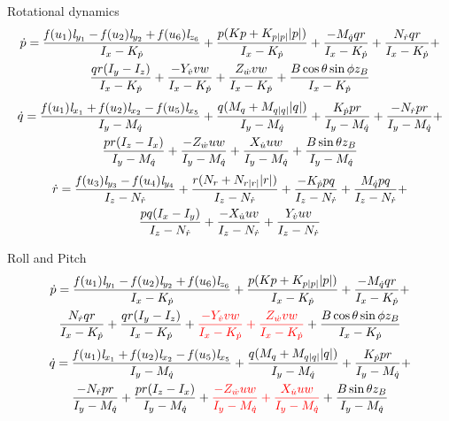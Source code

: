 \documentclass[11pt]{beamer}
\begin{document}
\begin{frame}[shrink]{Rotational dynamics}
\begin{multline} \label{eq:p_dot}
\dot{p} = \frac{\mathit{f}(u_{1}) \mathit{l}_{y_{1}} - \mathit{f}(u_{2}) \mathit{l}_{y_{2}} + \mathit{f}(u_{6}) \mathit{l}_{z_{6}}}{I_{x} - K_{\dot{p}}} + \frac{p (Kp + K_{p|p|} |p|)}{I_{x} - K_{\dot{p}}} + \frac{-M_{\dot{q}} q r}{I_{x} - K_{\dot{p}}} + \frac{N_{\dot{r}} q r}{I_{x} - K_{\dot{p}}} +\\
\frac{q r (I_{y} - I_{z})}{I_{x} - K_{\dot{p}}} + \frac{- Y_{\dot{v}} v w}{I_{x} - K_{\dot{p}}} + \frac{Z_{\dot{w}} v w}{I_{x} - K_{\dot{p}}} + \frac{B \cos{\theta} \sin{\phi} z_B}{I_{x} - K_{\dot{p}}}
\end{multline}
\begin{multline} \label{eq:q_dot}
\dot{q} =\frac{\mathit{f}(u_{1}) \mathit{l}_{x_{1}} + \mathit{f}(u_{2}) \mathit{l}_{x_{2}} - \mathit{f}(u_{5}) \mathit{l}_{x_{5}}}{I_{y} - M_{\dot{q}}} + \frac{q (M_{q} + M_{q|q|} |q|)}{I_{y} - M_{\dot{q}}} + \frac{K_{\dot{p}} p r}{I_{y} - M_{\dot{q}}} + \frac{-N_{\dot{r}} p r}{I_{y} - M_{\dot{q}}} +\\
\frac{p r (I_{z} - I_{x})}{I_{y} - M_{\dot{q}}} + \frac{-Z_{\dot{w}} u w}{I_{y} - M_{\dot{q}}} + \frac{X_{\dot{u}} u w}{I_{y} - M_{\dot{q}}} + \frac{B \sin{\theta} z_B}{I_{y} - M_{\dot{q}}} 
\end{multline}
\begin{multline} \label{eq:r_dot}
\dot{r} = \frac{\mathit{f}(u_{3}) \mathit{l}_{y_{3}} - \mathit{f}(u_{4}) \mathit{l}_{y_{4}}}{I_{z} - N_{\dot{r}}} + \frac{r (N_{r} + N_{r|r|} |r|)}{I_{z} - N_{\dot{r}}} + \frac{-K_{\dot{p}} p q}{I_{z} - N_{\dot{r}}} + \frac{M_{\dot{q}} p q}{I_{z} - N_{\dot{r}}} +\\
\frac{p q (I_{x} - I_{y})}{I_{z} - N_{\dot{r}}} + \frac{- X_{\dot{u}} u v}{I_{z} - N_{\dot{r}}} + \frac{Y_{\dot{v}} u v}{I_{z} - N_{\dot{r}}}
\end{multline} 
\end{frame}

\begin{frame}[shrink]{Roll and Pitch}
\begin{multline*}
\dot{p} = \frac{\mathit{f}(u_{1}) \mathit{l}_{y_{1}} - \mathit{f}(u_{2}) \mathit{l}_{y_{2}} + \mathit{f}(u_{6}) \mathit{l}_{z_{6}}}{I_{x} - K_{\dot{p}}} + \frac{p (Kp + K_{p|p|} |p|)}{I_{x} - K_{\dot{p}}} + \frac{-M_{\dot{q}} q r}{I_{x} - K_{\dot{p}}} + \\ \frac{N_{\dot{r}} q r}{I_{x} - K_{\dot{p}}} + \frac{q r (I_{y} - I_{z})}{I_{x} - K_{\dot{p}}} + \textcolor{red}{\frac{- Y_{\dot{v}} v w}{I_{x} - K_{\dot{p}}} + \frac{Z_{\dot{w}} v w}{I_{x} - K_{\dot{p}}}} + \frac{B \cos{\theta} \sin{\phi} z_B}{I_{x} - K_{\dot{p}}}
\end{multline*}
\begin{multline*}
\dot{q} =\frac{\mathit{f}(u_{1}) \mathit{l}_{x_{1}} + \mathit{f}(u_{2}) \mathit{l}_{x_{2}} - \mathit{f}(u_{5}) \mathit{l}_{x_{5}}}{I_{y} - M_{\dot{q}}} + \frac{q (M_{q} + M_{q|q|} |q|)}{I_{y} - M_{\dot{q}}} + \frac{K_{\dot{p}} p r}{I_{y} - M_{\dot{q}}} +\\ \frac{-N_{\dot{r}} p r}{I_{y} - M_{\dot{q}}} + \frac{p r (I_{z} - I_{x})}{I_{y} - M_{\dot{q}}} + \textcolor{red}{\frac{-Z_{\dot{w}} u w}{I_{y} - M_{\dot{q}}} + \frac{X_{\dot{u}} u w}{I_{y} - M_{\dot{q}}}} + \frac{B \sin{\theta} z_B}{I_{y} - M_{\dot{q}}} 
\end{multline*}
\end{frame}
\end{document}
